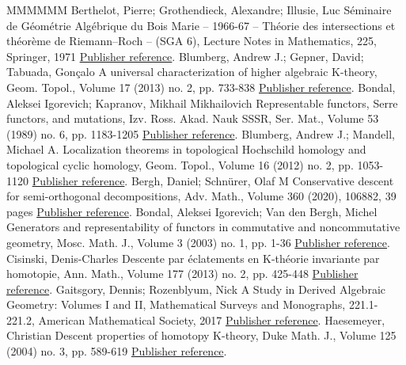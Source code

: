 \begin{thebibliography}{MMMMMM}
 Berthelot, Pierre; Grothendieck, Alexandre; Illusie, Luc Séminaire de Géométrie Algébrique du Bois Marie – 1966-67 – Théorie des intersections et théorème de Riemann–Roch – (SGA 6), Lecture Notes in Mathematics, 225, Springer, 1971 \href{https://ahl.centre-mersenne.org/item/AHL_2020__3__1091_0/#SGA6}{Publisher reference}.
 Blumberg, Andrew J.; Gepner, David; Tabuada, Gonçalo A universal characterization of higher algebraic K-theory, Geom. Topol., Volume 17 (2013) no. 2, pp. 733-838 \href{https://ahl.centre-mersenne.org/item/AHL_2020__3__1091_0/#BlumbergGepnerTabuada}{Publisher reference}.
 Bondal, Aleksei Igorevich; Kapranov, Mikhail Mikhailovich Representable functors, Serre functors, and mutations, Izv. Ross. Akad. Nauk SSSR, Ser. Mat., Volume 53 (1989) no. 6, pp. 1183-1205 \href{https://ahl.centre-mersenne.org/item/AHL_2020__3__1091_0/#BondalKapranov}{Publisher reference}.
 Blumberg, Andrew J.; Mandell, Michael A. Localization theorems in topological Hochschild homology and topological cyclic homology, Geom. Topol., Volume 16 (2012) no. 2, pp. 1053-1120 \href{https://ahl.centre-mersenne.org/item/AHL_2020__3__1091_0/#BlumbergMandellTHH}{Publisher reference}.
 Bergh, Daniel; Schnürer, Olaf M Conservative descent for semi-orthogonal decompositions, Adv. Math., Volume 360 (2020), 106882, 39 pages \href{https://ahl.centre-mersenne.org/item/AHL_2020__3__1091_0/#BerghSchnuerer}{Publisher reference}.
 Bondal, Aleksei Igorevich; Van den Bergh, Michel Generators and representability of functors in commutative and noncommutative geometry, Mosc. Math. J., Volume 3 (2003) no. 1, pp. 1-36 \href{https://ahl.centre-mersenne.org/item/AHL_2020__3__1091_0/#BondalVDB}{Publisher reference}.
 Cisinski, Denis-Charles Descente par éclatements en K-théorie invariante par homotopie, Ann. Math., Volume 177 (2013) no. 2, pp. 425-448 \href{https://ahl.centre-mersenne.org/item/AHL_2020__3__1091_0/#CisinskiKH}{Publisher reference}.
 Gaitsgory, Dennis; Rozenblyum, Nick A Study in Derived Algebraic Geometry: Volumes I and II, Mathematical Surveys and Monographs, 221.1-221.2, American Mathematical Society, 2017 \href{https://ahl.centre-mersenne.org/item/AHL_2020__3__1091_0/#GaitsgoryRozenblyum}{Publisher reference}.
 Haesemeyer, Christian Descent properties of homotopy K-theory, Duke Math. J., Volume 125 (2004) no. 3, pp. 589-619 \href{https://ahl.centre-mersenne.org/item/AHL_2020__3__1091_0/#Haesemeyer}{Publisher reference}.

\end{thebibliography}
